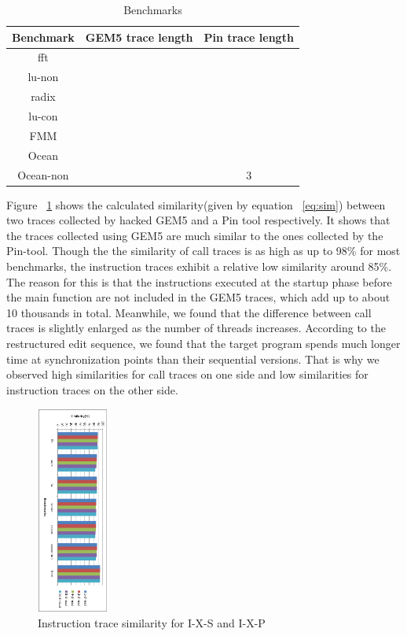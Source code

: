 \documentclass[10pt,journal,cspaper,compsoc]{IEEEtran}
\begin{document}


\begin{table}
\caption{Benchmarks} \label{tab:benchmark} \centering
\begin{tabular}{|c|c|c|}
\hline Benchmark & GEM5 trace length & Pin trace length\\
\hline fft &  &  \\
\hline lu-non &  & \\
\hline radix &  &  \\
\hline lu-con &  &  \\
\hline FMM &  & \\
\hline Ocean &  & \\
\hline Ocean-non &  & 3\\
\hline
\end{tabular}
\end{table}

Figure ~\ref{fig:x86_sis_sim} shows the calculated similarity(given
by equation ~\ref{eq:sim}) between two traces collected by hacked
GEM5 and a Pin tool respectively. It shows that the
traces collected using GEM5 are much similar to the ones collected
by the Pin-tool. Though the the similarity of call traces is as high
as up to 98\% for most benchmarks, the instruction traces exhibit a
relative low similarity around 85\%. The reason for this is that the instructions executed at the
startup phase before the main function are not included in the GEM5
traces, which add up to about 10 thousands in total. Meanwhile, we
found that the difference between call traces is slightly
enlarged as the number of threads increases. According to the restructured edit
sequence, we found that the target program spends much
longer time at synchronization points than their sequential
versions. That is why we observed high
similarities for call traces on one side and low similarities for
instruction traces on the other side.

\begin{figure}
\centering
\includegraphics[width=0.21\textwidth, angle=90]{fig/x86_s_sim1.eps}
\caption{Instruction trace similarity for I-X-S and I-X-P}
\label{fig:x86_sis_sim}       %
\end{figure}
\end{document}
